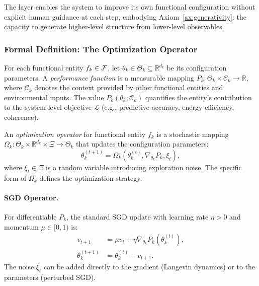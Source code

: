 The layer enables the system to improve its own functional configuration without explicit human guidance at each step, embodying Axiom~\ref{ax:generativity}: the capacity to generate higher-level structure from lower-level observables.

\subsubsection{Formal Definition: The Optimization Operator}
\begin{definition}
For each functional entity $f_k \in \mathcal{F}$, let $\theta_k \in \Theta_k \subseteq \mathbb{R}^{d_k}$ be its configuration parameters. A \emph{performance function} is a measurable mapping $P_k: \Theta_k \times \mathcal{C}_k \to \mathbb{R}$, where $\mathcal{C}_k$ denotes the context provided by other functional entities and environmental inputs. The value $P_k(\theta_k; \mathcal{C}_k)$ quantifies the entity's contribution to the system-level objective $\mathcal{L}$ (e.g., predictive accuracy, energy efficiency, coherence).
\end{definition}

\begin{definition}
An \emph{optimization operator} for functional entity $f_k$ is a stochastic mapping $\Omega_k: \Theta_k \times \mathbb{R}^{d_k} \times \Xi \to \Theta_k$ that updates the configuration parameters:
\[
\theta_k^{(t+1)} = \Omega_k(\theta_k^{(t)}, \nabla_{\theta_k} P_k, \xi_t),
\]
where $\xi_t \in \Xi$ is a random variable introducing exploration noise. The specific form of $\Omega_k$ defines the optimization strategy.
\end{definition}

\paragraph{SGD Operator.} For differentiable $P_k$, the standard SGD update with learning rate $\eta > 0$ and momentum $\mu \in [0,1)$ is:
\[
\begin{aligned}
v_{t+1} &= \mu v_t + \eta \nabla_{\theta_k} P_k(\theta_k^{(t)}), \\
\theta_k^{(t+1)} &= \theta_k^{(t)} - v_{t+1}.
\end{aligned}
\]
The noise $\xi_t$ can be added directly to the gradient (Langevin dynamics) or to the parameters (perturbed SGD).

